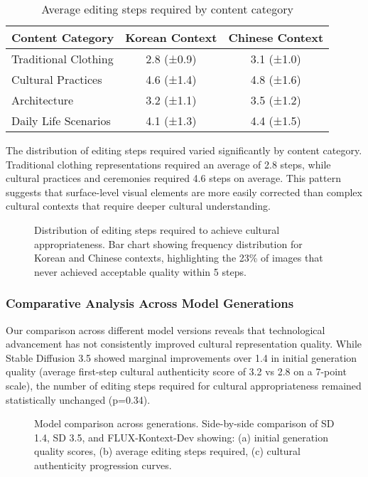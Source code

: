 \documentclass{article}
\begin{document}
\begin{table}[h]
  \caption{Average editing steps required by content category}
  \label{table:editing-steps-by-category}
  \centering
  \begin{tabular}{lcc}
    \toprule
    Content Category & Korean Context & Chinese Context \\
    \midrule
    Traditional Clothing & 2.8 (±0.9) & 3.1 (±1.0) \\
    Cultural Practices & 4.6 (±1.4) & 4.8 (±1.6) \\
    Architecture & 3.2 (±1.1) & 3.5 (±1.2) \\
    Daily Life Scenarios & 4.1 (±1.3) & 4.4 (±1.5) \\
    \bottomrule
  \end{tabular}
\end{table}

The distribution of editing steps required varied significantly by content category. Traditional clothing representations required an average of 2.8 steps, while cultural practices and ceremonies required 4.6 steps on average. This pattern suggests that surface-level visual elements are more easily corrected than complex cultural contexts that require deeper cultural understanding.

\begin{figure}[h]
  \centering
  \fbox{\rule[-.5cm]{0cm}{5cm} \rule[-.5cm]{12cm}{0cm}}
  \caption{Distribution of editing steps required to achieve cultural appropriateness. Bar chart showing frequency distribution for Korean and Chinese contexts, highlighting the 23\% of images that never achieved acceptable quality within 5 steps.}
  \label{fig:editing-steps-distribution}
\end{figure}

\subsubsection{Comparative Analysis Across Model Generations}

Our comparison across different model versions reveals that technological advancement has not consistently improved cultural representation quality. While Stable Diffusion 3.5 showed marginal improvements over 1.4 in initial generation quality (average first-step cultural authenticity score of 3.2 vs 2.8 on a 7-point scale), the number of editing steps required for cultural appropriateness remained statistically unchanged (p=0.34).

\begin{figure}[h]
  \centering
  \fbox{\rule[-.5cm]{0cm}{6cm} \rule[-.5cm]{12cm}{0cm}}
  \caption{Model comparison across generations. Side-by-side comparison of SD 1.4, SD 3.5, and FLUX-Kontext-Dev showing: (a) initial generation quality scores, (b) average editing steps required, (c) cultural authenticity progression curves.}
  \label{fig:model-comparison}
\end{figure}
\end{document}
